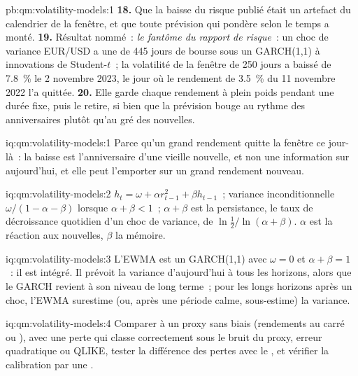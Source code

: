 \begin{solution}{pb:qm:volatility-models:1}
\textbf{18.} Que la baisse du risque publié était un artefact du calendrier de la fenêtre, et que toute prévision qui pondère selon le temps a monté.
\textbf{19.} Résultat nommé~: \emph{le fantôme du rapport de risque}~: un choc de variance EUR/USD a une  de 445 jours de bourse sous un GARCH(1,1) à innovations de Student-$t$~;
la volatilité de la fenêtre de 250 jours a baissé de 7.8~\% le 2 novembre 2023, le jour où le rendement de 3.5~\% du 11 novembre 2022 l'a quittée.
\textbf{20.} Elle garde chaque rendement à plein poids pendant une durée fixe, puis le retire, si bien que la prévision bouge au rythme des anniversaires plutôt qu'au gré des nouvelles.
\end{solution}

\begin{solution}{iq:qm:volatility-models:1}
Parce qu'un grand rendement quitte la fenêtre ce jour-là~: la baisse est l'anniversaire d'une vieille nouvelle, et non une information sur aujourd'hui, et elle peut l'emporter sur un grand rendement nouveau.
\end{solution}

\begin{solution}{iq:qm:volatility-models:2}
$h_t = \omega + \alpha r_{t-1}^2 + \beta h_{t-1}$~; variance inconditionnelle $\omega/(1 - \alpha - \beta)$ lorsque $\alpha + \beta < 1$~; $\alpha + \beta$ est la persistance, le taux de décroissance quotidien
d'un choc de variance, de  $\ln\frac12/\ln(\alpha + \beta)$. $\alpha$ est la réaction aux nouvelles, $\beta$ la mémoire.
\end{solution}

\begin{solution}{iq:qm:volatility-models:3}
L'EWMA est un GARCH(1,1) avec $\omega = 0$ et $\alpha + \beta = 1$~: il est intégré. Il prévoit la variance d'aujourd'hui à tous les horizons, alors que le GARCH revient à son niveau de long terme~; pour
les longs horizons après un choc, l'EWMA surestime (ou, après une période calme, sous-estime) la variance.
\end{solution}

\begin{solution}{iq:qm:volatility-models:4}
Comparer à un proxy sans biais (rendements au carré ou ), avec une perte qui classe correctement sous le bruit du proxy, erreur quadratique ou QLIKE, tester la
différence des pertes avec le , et vérifier la calibration par une .
\end{solution}

